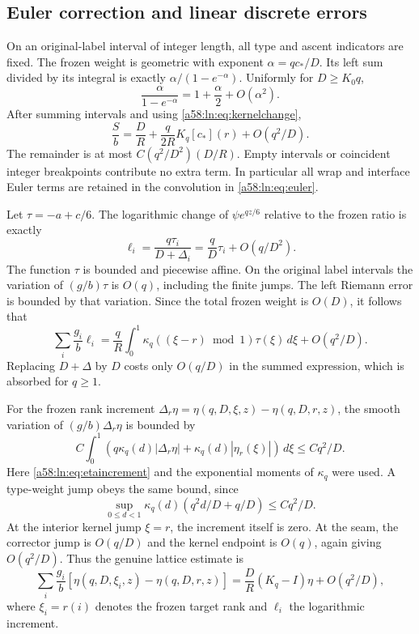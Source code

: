 \documentclass[11pt,letterpaper]{article}
\theoremstyle{remark}
\newcommand{\dd}{\,d}
\begin{document}
\subsection{Euler correction and linear discrete errors}
On an original-label interval of integer length, all type and ascent
indicators are fixed. The frozen weight is geometric with exponent
$\alpha=qc_*/D$. Its left sum divided by its integral is exactly
$\alpha/(1-e^{-\alpha})$. Uniformly for $D\ge K_0q$,
\[
 \frac{\alpha}{1-e^{-\alpha}}=1+\frac\alpha2+O(\alpha^2).
\]
After summing intervals and using \eqref{a58:ln:eq:kernelchange},
\begin{equation}\label{a58:ln:eq:euler}
 \frac Sb=\frac DR+\frac q{2R}K_q[c_*](r)+O(q^2/D).
\end{equation}
The remainder is at most $C(q^2/D^2)(D/R)$. Empty intervals or
coincident integer breakpoints contribute no extra term. In particular
all wrap and interface Euler terms are retained in the convolution in
\eqref{a58:ln:eq:euler}.

Let $\tau=-a+c/6$. The logarithmic change of $\psi e^{qz/6}$ relative
to the frozen ratio is exactly
\[
 \ell_i=\frac{q\tau_i}{D+\Delta_i}
      =\frac qD\tau_i+O(q/D^2).
\]
The function $\tau$ is bounded and piecewise affine. On the original
label intervals the variation of $(g/b)\tau$ is $O(q)$, including the
finite jumps. The left Riemann error is bounded by that variation.
Since the total frozen weight is $O(D)$, it follows that
\begin{equation}\label{a58:ln:eq:linearxi}
 \sum_i\frac{g_i}b\ell_i
 =\frac qR\int_0^1\kappa_q((\xi-r)\bmod1)\tau(\xi)\dd\xi
   +O(q^2/D).
\end{equation}
Replacing $D+\Delta$ by $D$ costs only $O(q/D)$ in the summed
expression, which is absorbed for $q\ge1$.

For the frozen rank increment $\Delta_r\eta=\eta(q,D,\xi,z)-\eta(q,D,r,z)$,
the smooth variation of $(g/b)\Delta_r\eta$ is bounded by
\[
 C\int_0^1\left(q\kappa_q(d)|\Delta_r\eta|
                      +\kappa_q(d)|\eta_r(\xi)|\right)\dd\xi
 \le Cq^2/D.
\]
Here \eqref{a58:ln:eq:etaincrement} and the exponential moments of $\kappa_q$
were used. A type-weight jump obeys the same bound, since
\[
 \sup_{0\le d<1}\kappa_q(d)(q^2d/D+q/D)\le Cq^2/D.
\]
At the interior kernel jump $\xi=r$, the increment itself is zero.
At the seam, the corrector jump is $O(q/D)$ and the kernel endpoint is
$O(q)$, again giving $O(q^2/D)$. Thus the genuine lattice estimate is
\begin{equation}\label{a58:ln:eq:lineareta}
 \sum_i\frac{g_i}b[\eta(q,D,\xi_i,z)-\eta(q,D,r,z)]
 =\frac DR(K_q-I)\eta+O(q^2/D),
\end{equation}
where $\xi_i=r(i)$ denotes the frozen target rank and $\ell_i$ the logarithmic increment.
\end{document}
